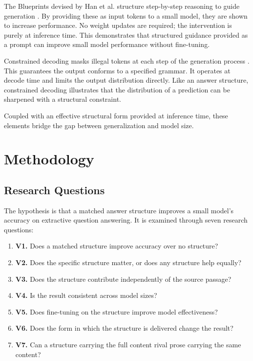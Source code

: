 \documentclass{article}
\begin{document}
The Blueprints devised by Han et al. structure step-by-step reasoning to guide generation \cite{han2025blueprints}. By providing these as input tokens to a small model, they are shown to increase performance. No weight updates are required; the intervention is purely at inference time. This demonstrates that structured guidance provided as a prompt can improve small model performance without fine-tuning.

Constrained decoding masks illegal tokens at each step of the generation process \cite{willard2023guided}. This guarantees the output conforms to a specified grammar. It operates at decode time and limits the output distribution directly. Like an answer structure, constrained decoding illustrates that the distribution of a prediction can be sharpened with a structural constraint.

Coupled with an effective structural form provided at inference time, these elements bridge the gap between generalization and model size.

\section{Methodology}

\subsection{Research Questions}

The hypothesis is that a matched answer structure improves a small model's accuracy on extractive question answering. It is examined through seven research questions:

\begin{enumerate}
  \item \textbf{V1.} Does a matched structure improve accuracy over no structure?
  \item \textbf{V2.} Does the specific structure matter, or does any structure help equally?
  \item \textbf{V3.} Does the structure contribute independently of the source passage?
  \item \textbf{V4.} Is the result consistent across model sizes?
  \item \textbf{V5.} Does fine-tuning on the structure improve model effectiveness?
  \item \textbf{V6.} Does the form in which the structure is delivered change the result?
  \item \textbf{V7.} Can a structure carrying the full content rival prose carrying the same content?
\end{enumerate}
\end{document}
